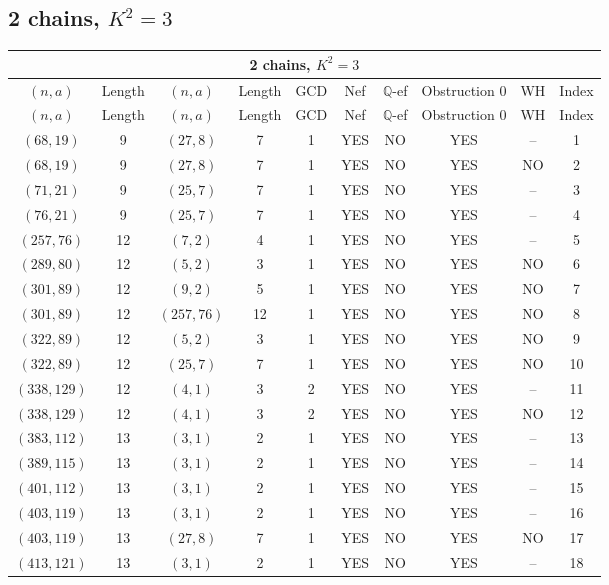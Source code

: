 \subsection{2 chains, $K^2 = 3$}
\begin{longtable}{|c|c|c|c|c|c|c|c|c|c|}
\hline
\multicolumn{10}{|c|}{2 chains, $K^2 = 3$}\\
\hline
$(n,a)$ & Length & $(n,a)$ & Length & GCD & Nef & $\mathbb Q$-ef & Obstruction 0 & WH & Index\\
\hline
\endfirsthead

\hline
$(n,a)$ & Length & $(n,a)$ & Length & GCD & Nef & $\mathbb Q$-ef & Obstruction 0 & WH & Index\\
\hline
\endhead
\hline
\endfoot

$(68, 19)$ & 9 & $(27, 8)$ & 7 & 1 & YES & NO & YES & -- & 1\\
$(68, 19)$ & 9 & $(27, 8)$ & 7 & 1 & YES & NO & YES & NO & 2\\
$(71, 21)$ & 9 & $(25, 7)$ & 7 & 1 & YES & NO & YES & -- & 3\\
$(76, 21)$ & 9 & $(25, 7)$ & 7 & 1 & YES & NO & YES & -- & 4\\
$(257, 76)$ & 12 & $(7, 2)$ & 4 & 1 & YES & NO & YES & -- & 5\\
$(289, 80)$ & 12 & $(5, 2)$ & 3 & 1 & YES & NO & YES & NO & 6\\
$(301, 89)$ & 12 & $(9, 2)$ & 5 & 1 & YES & NO & YES & NO & 7\\
$(301, 89)$ & 12 & $(257, 76)$ & 12 & 1 & YES & NO & YES & NO & 8\\
$(322, 89)$ & 12 & $(5, 2)$ & 3 & 1 & YES & NO & YES & NO & 9\\
$(322, 89)$ & 12 & $(25, 7)$ & 7 & 1 & YES & NO & YES & NO & 10\\
$(338, 129)$ & 12 & $(4, 1)$ & 3 & 2 & YES & NO & YES & -- & 11\\
$(338, 129)$ & 12 & $(4, 1)$ & 3 & 2 & YES & NO & YES & NO & 12\\
$(383, 112)$ & 13 & $(3, 1)$ & 2 & 1 & YES & NO & YES & -- & 13\\
$(389, 115)$ & 13 & $(3, 1)$ & 2 & 1 & YES & NO & YES & -- & 14\\
$(401, 112)$ & 13 & $(3, 1)$ & 2 & 1 & YES & NO & YES & -- & 15\\
$(403, 119)$ & 13 & $(3, 1)$ & 2 & 1 & YES & NO & YES & -- & 16\\
$(403, 119)$ & 13 & $(27, 8)$ & 7 & 1 & YES & NO & YES & NO & 17\\
$(413, 121)$ & 13 & $(3, 1)$ & 2 & 1 & YES & NO & YES & -- & 18\\

\end{longtable}
